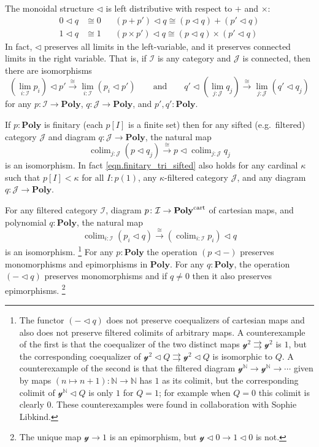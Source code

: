 \documentclass[11pt, one side, article]{memoir}
\theoremstyle{definition}
\theoremstyle{plain}
\DeclareMathOperator*{\colim}{colim}
\newcommand{\cat}[1]{\mathcal{#1}}%
\newcommand{\Cat}[1]{\mathbf{#1}}%
\newcommand{\tto}{\rightrightarrows}
\newcommand{\To}[2][]{\xrightarrow[#1]{#2}}
\newcommand{\tn}[1]{\textnormal{#1}}
\newcommand{\nn}{\mathbb{N}}
\newcommand{\yon}{\mathcal{y}}
\newcommand{\poly}{\Cat{Poly}}
\newcommand{\polycart}{\poly^{\tn{cart}}}
\newcommand{\0}{\textsf{0}}
\newcommand{\1}{\tn{\textsf{1}}}
\newcommand{\tri}{\mathbin{\triangleleft}}
\newcommand{\qqand}{\qquad\text{and}\qquad}
\begin{document}
The monoidal structure $\tri$ is left distributive with respect to $+$ and $\times$:
\begin{align}
	0\tri q&\cong 0&&(p+p')\tri q\cong (p\tri q)+(p'\tri q)\label{eqn.comp_plus}\\
	1\tri q&\cong 1&&(p\times p')\tri q\cong (p\tri q)\times(p'\tri q)\label{eqn.comp_times}
\end{align}
In fact, $\tri$ preserves all limits in the left-variable, and it preserves connected limits in the right variable. That is, if $\cat{I}$ is any category and $\cat{J}$ is connected, then there are isomorphisms
\begin{equation}
\left(\lim_{i:\cat{I}}p_i\right)\tri p'\To{\cong}\lim_{i:\cat{I}}(p_i\tri p')
\qqand
q'\tri\left(\lim_{j:\cat{J}}q_j\right)\To{\cong}\lim_{j:\cat{J}}(q'\tri q_j)
\end{equation}
for any $p\colon\cat{I}\to\poly$, $q\colon\cat{J}\to\poly$, and $p',q':\poly$.

If $p:\poly$ is finitary (each $p[I]$ is a finite set) then for any sifted (e.g.\ filtered) category $\cat{J}$ and diagram $q\colon \cat{J}\to\poly$, the natural map
\begin{equation}\label{eqn.finitary_tri_sifted}
  \colim_{j: \cat{J}}(p\tri q_j)
  \To{\cong}
	p\tri\colim_{j: \cat{J}}q_j
\end{equation}
is an isomorphism. In fact \cref{eqn.finitary_tri_sifted} also holds for any cardinal $\kappa$ such that $p[I]<\kappa$ for all $I:p(1)$, any $\kappa$-filtered category $\cat{J}$, and any diagram $q\colon \cat{J}\to\poly$.

For any filtered category $\cat{I}$, diagram $p\colon \cat{I}\to\polycart$ of cartesian maps, and polynomial $q:\poly$, the natural map
\begin{equation}\label{eqn.cart_tri}
	\colim_{i: \cat{I}}(p_i\tri q)
	\To{\cong}
	(\colim_{i: \cat{I}}p_i)\tri q
\end{equation}
is an isomorphism.%
\footnote{The functor $(-\tri q)$ does not preserve coequalizers of cartesian maps and also does not preserve filtered colimits of arbitrary maps. A counterexample of the first is that the coequalizer of the two distinct maps $\yon^2\tto\yon^2$ is $1$, but the corresponding coequalizer of $\yon^2\tri Q\tto \yon^2\tri Q$ is isomorphic to $Q$. A counterexample of the second is that the filtered diagram $\yon^\nn\to\yon^\nn\to\cdots$ given by maps $(n\mapsto n+1)\colon\nn\to\nn$ has $1$ as its colimit, but the corresponding colimit of $\yon^\nn\tri Q$ is only $1$ for $Q=1$; for example when $Q=0$ this colimit is clearly $0$. These counterexamples were found in collaboration with Sophie Libkind.
}
 For any $p:\poly$ the operation $(p\tri -)$ preserves monomorphisms and epimorphisms in $\poly$. For any $q:\poly$, the operation $(-\tri q)$ preserves monomorphisms and if $q\neq 0$ then it also preserves epimorphisms.%
\footnote{The unique map $\yon\to 1 $ is an epimorphism, but $\yon\tri 0\to 1\tri 0$ is not.}
\end{document}
